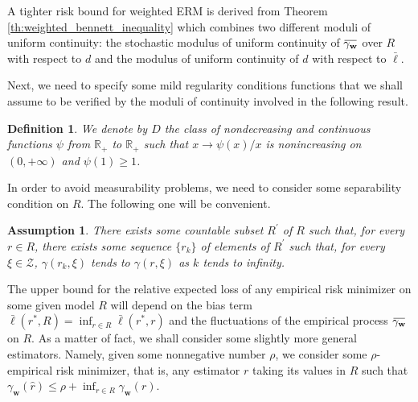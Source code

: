 \documentclass[letterpaper]{article} %
\newtheorem{definition}{Definition}
\newtheorem{assumption}{Assumption}
\newcommand{\overbar}[1]{\mkern 1.5mu\overline{\mkern-1.5mu#1\mkern-1.5mu}\mkern 1.5mu}
\newcommand*\cen[1]{\overbar{#1}}
\newcommand{\weight}{\mathbf{w}}
\newcommand{\relossf}{\bar{\ell}}
\newcommand{\cenprocess}[1]{\cen{\gamma_{#1}}}
\begin{document}
A tighter risk bound for weighted ERM is derived from Theorem \ref{th:weighted_bennett_inequality} which combines two different moduli of uniform continuity: the stochastic modulus of uniform continuity of $\cenprocess{\weight}$ over $R$ with respect to $d$ and the modulus of uniform continuity of $d$ with respect to $\relossf$.

Next, we need to specify some mild regularity conditions functions that we shall assume to be verified by the moduli of continuity involved in the following result.

\begin{definition}
\label{con:nondecreasing_condition}
    We denote by $D$ the class of nondecreasing and continuous functions $\psi$ from $\mathbb R_+$ to $\mathbb R_+$ such that $x\to \psi(x)/x$ is nonincreasing on $(0,+\infty)$ and $\psi(1)\ge 1$.
\end{definition}

In order to avoid measurability problems, we need to consider some separability condition on $R$. The following one will be convenient.

\begin{assumption}
\label{con:separability_condition}
    There exists some countable subset $R^\prime$ of $R$ such that, for every $r\in R$, there exists some sequence $\{r_k\}$ of elements of $R^\prime$ such that, for every $\xi \in \mathcal Z$, $\gamma(r_k, \xi)$ tends to $\gamma(r,\xi)$ as $k$ tends to infinity.
\end{assumption}

The upper bound for the relative expected loss of any empirical risk minimizer on some given model $R$ will depend on the bias term $\relossf(r^*,R)=\inf_{r\in R}\relossf(r^*,r)$ and the fluctuations of the empirical process $\cenprocess{\weight{}}$ on $R$. As a matter of fact, we shall consider some slightly more general estimators. Namely, given some nonnegative number $\rho$, we consider some $\rho$-empirical risk minimizer, that is, any estimator $r$ taking its values in $R$ such that $\gamma_\weight(\hat{r})\le \rho+\inf_{r\in R}\gamma_\weight(r)$.
\end{document}

